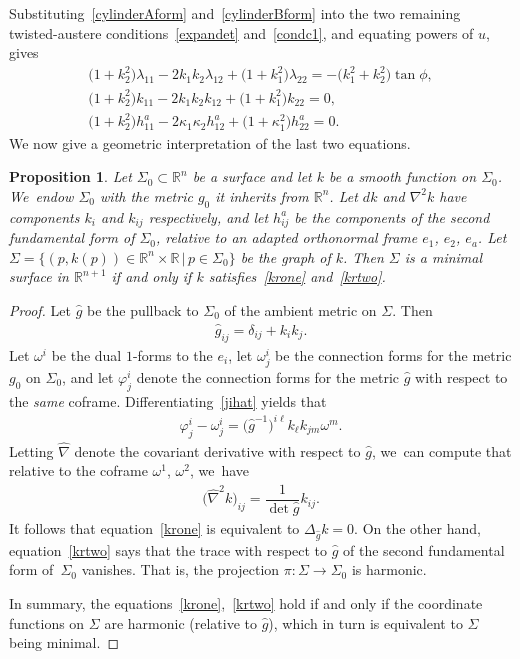 \documentclass[pdftex]{sigma}
\def\R{\mathbb{R}}
\def\w{\omega}
\def\ghat{\widehat{g}}
\def\hatnabla{\widehat{\nabla}}
\newtheorem{Proposition}[Theorem]{Proposition}
\numberwithin{equation}{section}
\begin{document}
Substituting~\eqref{cylinderAform} and~\eqref{cylinderBform} into the two remaining twisted-austere conditions~\eqref{expandet} and~\eqref{condc1}, and equating powers of $u$, gives
\begin{gather}
\big(1 +k_2^2\big) \lambda_{11} - 2k_1k_2 \lambda_{12} + \big(1 + k_1^2\big) \lambda_{22} = -\big(k_1^2 +k_2^2\big) \tan \phi, \label{krell}
\\
\big(1+k_2^2\big) k_{11} - 2k_1 k_2 k_{12} + \big(1+k_1^2\big) k_{22} =0,
\label{krone}
\\
\big(1+k_2^2\big) h^a_{11} - 2\kappa_1\kappa_2 h^a_{12} + \big(1 + \kappa_1^2\big) h^a_{22} = 0.
\label{krtwo}
\end{gather}
We now give a geometric interpretation of the last two equations.

\begin{Proposition}
Let $\Sigma_0 \subset \R^n$ be a surface and let $k$ be a smooth function on $\Sigma_0$. We~endow $\Sigma_0$ with the metric $g_0$ it inherits from $\R^{n}$. Let $dk$ and $\nabla^2 k$ have components $k_i$ and $k_{ij}$ respectively, and let $h^a_{ij}$ be the components of the second fundamental form of $\Sigma_0$, relative to an adapted orthonormal frame $e_1$, $e_2$, $e_a$. Let $\Sigma = \big\{ (p, k(p)) \in \R^n \times \R \,|\, p \in \Sigma_0 \big\}$ be the graph of $k$. Then $\Sigma$ is a minimal surface in $\R^{n+1}$ if and only if $k$ satisfies~\eqref{krone} and~\eqref{krtwo}.
\end{Proposition}
\begin{proof} Let $\ghat$ be the pullback to $\Sigma_0$ of the ambient metric on $\Sigma$. Then
\begin{gather} \label{jihat}
\ghat_{ij} = \delta_{ij} + k_i k_j.\end{gather}
Let $\w^i$ be the dual $1$-forms to the $e_i$, let $\w^i_j$ be the connection forms for the metric $g_0$ on $\Sigma_0$, and let $\varphi^i_j$ denote the connection forms for the metric $\ghat$ with respect to the \emph{same} coframe. Differentiating~\eqref{jihat} yields that
\begin{gather} \label{changeconn}
\varphi^i_j - \w^i_j = \big(\ghat^{-1}\big)^{i\ell } k_\ell k_{jm} \w^m.
\end{gather}
Letting $\hatnabla$ denote the covariant derivative with respect to $\ghat$, we~can compute that relative to the coframe $\w^1$, $\w^2$, we~have
\begin{gather*}
\big(\hatnabla^2 k\big)_{ij} =\dfrac{1}{\det\ghat}k_{ij}.
\end{gather*}
It follows that equation~\eqref{krone} is equivalent to $\Delta_{\ghat} k = 0$. On the other hand, equation~\eqref{krtwo} says that the trace with respect to $\ghat$ of the second fundamental form of~$\Sigma_0$ vanishes. That is, the projection $\pi\colon \Sigma \to \Sigma_0$ is harmonic.

In summary, the equations~\eqref{krone},~\eqref{krtwo} hold if and only if the coordinate functions on $\Sigma$ are harmonic (relative to $\ghat$),
which in turn is equivalent to $\Sigma$ being minimal.
\end{proof}
\end{document}
